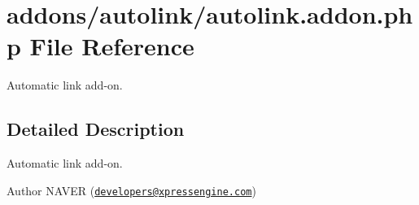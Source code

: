 \hypertarget{autolink_8addon_8php}{}\section{addons/autolink/autolink.addon.\+php File Reference}
\label{autolink_8addon_8php}


Automatic link add-\/on.  




\subsection{Detailed Description}
Automatic link add-\/on. 

\begin{DoxyAuthor}{Author}
N\+A\+V\+ER (\href{mailto:developers@xpressengine.com}{\tt developers@xpressengine.\+com}) 
\end{DoxyAuthor}
